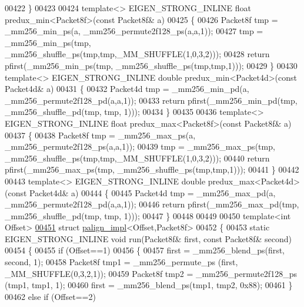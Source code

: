 \begin{DoxyCode}
{{00422 \}
00423 
00424 \textcolor{keyword}{template}<> EIGEN\_STRONG\_INLINE \textcolor{keywordtype}{float} predux\_min<Packet8f>(\textcolor{keyword}{const} Packet8f& a)
00425 \{
00426   Packet8f tmp = \_mm256\_min\_ps(a, \_mm256\_permute2f128\_ps(a,a,1));
00427   tmp = \_mm256\_min\_ps(tmp, \_mm256\_shuffle\_ps(tmp,tmp,\_MM\_SHUFFLE(1,0,3,2)));
00428   \textcolor{keywordflow}{return} pfirst(\_mm256\_min\_ps(tmp, \_mm256\_shuffle\_ps(tmp,tmp,1)));
00429 \}
00430 \textcolor{keyword}{template}<> EIGEN\_STRONG\_INLINE \textcolor{keywordtype}{double} predux\_min<Packet4d>(\textcolor{keyword}{const} Packet4d& a)
00431 \{
00432   Packet4d tmp = \_mm256\_min\_pd(a, \_mm256\_permute2f128\_pd(a,a,1));
00433   \textcolor{keywordflow}{return} pfirst(\_mm256\_min\_pd(tmp, \_mm256\_shuffle\_pd(tmp, tmp, 1)));
00434 \}
00435 
00436 \textcolor{keyword}{template}<> EIGEN\_STRONG\_INLINE \textcolor{keywordtype}{float} predux\_max<Packet8f>(\textcolor{keyword}{const} Packet8f& a)
00437 \{
00438   Packet8f tmp = \_mm256\_max\_ps(a, \_mm256\_permute2f128\_ps(a,a,1));
00439   tmp = \_mm256\_max\_ps(tmp, \_mm256\_shuffle\_ps(tmp,tmp,\_MM\_SHUFFLE(1,0,3,2)));
00440   \textcolor{keywordflow}{return} pfirst(\_mm256\_max\_ps(tmp, \_mm256\_shuffle\_ps(tmp,tmp,1)));
00441 \}
00442 
00443 \textcolor{keyword}{template}<> EIGEN\_STRONG\_INLINE \textcolor{keywordtype}{double} predux\_max<Packet4d>(\textcolor{keyword}{const} Packet4d& a)
00444 \{
00445   Packet4d tmp = \_mm256\_max\_pd(a, \_mm256\_permute2f128\_pd(a,a,1));
00446   \textcolor{keywordflow}{return} pfirst(\_mm256\_max\_pd(tmp, \_mm256\_shuffle\_pd(tmp, tmp, 1)));
00447 \}
00448 
00449 
00450 \textcolor{keyword}{template}<\textcolor{keywordtype}{int} Offset>
\hyperlink{struct_eigen_1_1internal_1_1palign__impl_3_01_offset_00_01_packet8f_01_4}{00451} \textcolor{keyword}{struct }\hyperlink{struct_eigen_1_1internal_1_1palign__impl}{palign\_impl}<Offset,Packet8f>
00452 \{
00453   \textcolor{keyword}{static} EIGEN\_STRONG\_INLINE \textcolor{keywordtype}{void} run(Packet8f& first, \textcolor{keyword}{const} Packet8f& second)
00454   \{
00455     \textcolor{keywordflow}{if} (Offset==1)
00456     \{
00457       first = \_mm256\_blend\_ps(first, second, 1);
00458       Packet8f tmp1 = \_mm256\_permute\_ps (first, \_MM\_SHUFFLE(0,3,2,1));
00459       Packet8f tmp2 = \_mm256\_permute2f128\_ps (tmp1, tmp1, 1);
00460       first = \_mm256\_blend\_ps(tmp1, tmp2, 0x88);
00461     \}
00462     \textcolor{keywordflow}{else} \textcolor{keywordflow}{if} (Offset==2)
}}
\end{DoxyCode}
